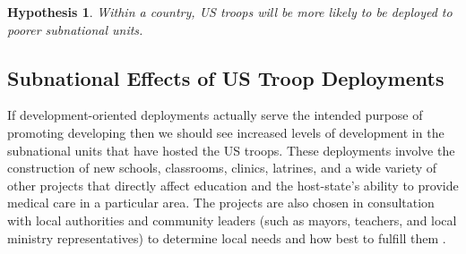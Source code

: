 \documentclass[12pt]{article}
\newtheorem{hyp}{Hypothesis}
\begin{document}
\begin{doublespace}
\begin{hyp}
Within a country, US troops will be more likely to be deployed to poorer subnational units.
\end{hyp}








\subsection{Subnational Effects of US Troop Deployments}
If development-oriented deployments actually serve the intended purpose of promoting developing then we should see increased levels of development in the subnational units that have hosted the US troops. These deployments involve the construction of new schools, classrooms, clinics, latrines, and a wide variety of other projects that directly affect education and the host-state's ability to provide medical care in a particular area.  The projects are also chosen in consultation with local authorities and community leaders (such as mayors, teachers, and local ministry representatives) to determine local needs and how best to fulfill them \cite{CPT20160309}.  


\end{doublespace}
\end{document}
